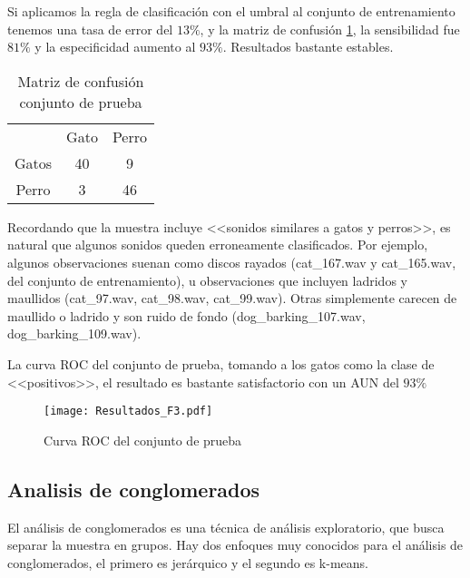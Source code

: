 \documentclass[twocolumn,10pt]{asme2ej}
\begin{document}
Si aplicamos la regla de clasificaci\'on con el umbral al conjunto de entrenamiento tenemos una tasa de error del $13\%$, y la matriz de confusi\'on  \ref{tbl:confusion_prue1}, la sensibilidad fue $81\%$ y la especificidad aumento al $93\%$. Resultados bastante estables.
\begin{table}[h]
\begin{tabular}{ccc}
 & Gato & Perro\\
 Gatos & 40& 9\\
Perro & 3 & 46\\
\end{tabular}
\caption{Matriz de confusi\'on conjunto de prueba}
\label{tbl:confusion_prue1}
\end{table}

Recordando que la muestra incluye <<sonidos similares a gatos y perros>>, es natural que algunos sonidos queden erroneamente clasificados. Por ejemplo, algunos observaciones suenan como discos rayados (cat\_167.wav y cat\_165.wav, del conjunto de entrenamiento), u observaciones que incluyen ladridos y maullidos (cat\_97.wav, cat\_98.wav, cat\_99.wav). Otras simplemente carecen de maullido o ladrido y son ruido de fondo (dog\_barking\_107.wav, dog\_barking\_109.wav).

La curva ROC del conjunto de prueba, tomando a los gatos como la clase de <<positivos>>, el resultado es bastante satisfactorio con un AUN del $93\%$
\begin{figure}[h]
  \centering
    \texttt{[image: Resultados\_F3.pdf]}
  \caption{Curva ROC del conjunto de prueba}
  \label{plot:curva_ro_prue}
\end{figure}
\subsection*{Analisis de conglomerados} %
\label{sub:analisis_de_conglomerados}
El an\'alisis de conglomerados es una t\'ecnica de an\'alisis exploratorio, que busca separar la muestra en grupos\cite{GOLDSTEIN}. Hay dos enfoques muy conocidos para el an\'alisis de conglomerados, el primero es jer\'arquico y el segundo es k-means.\\
\end{document}
